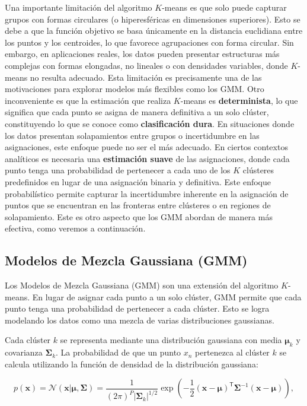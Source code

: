 Una importante limitación del algoritmo \(K\)-means es que solo puede capturar grupos con formas circulares (o hiperesféricas en dimensiones superiores). Esto se debe a que la función objetivo se basa únicamente en la distancia euclidiana entre los puntos y los centroides, lo que favorece agrupaciones con forma circular. Sin embargo, en aplicaciones reales, los datos pueden presentar estructuras más complejas con formas elongadas, no lineales o con densidades variables, donde \(K\)-means no resulta adecuado. Esta limitación es precisamente una de las motivaciones para explorar modelos más flexibles como los GMM. Otro inconveniente es que la estimación que realiza \(K\)-means es \textbf{determinista}, lo que significa que cada punto se asigna de manera definitiva a un solo clúster, constituyendo lo que se conoce como \textbf{clasificación dura}. En situaciones donde los datos presentan solapamientos entre grupos o incertidumbre en las asignaciones, este enfoque puede no ser el más adecuado. En ciertos contextos analíticos es necesaria una \textbf{estimación suave} de las asignaciones, donde cada punto tenga una probabilidad de pertenecer a cada uno de los \(K\) clústeres predefinidos en lugar de una asignación binaria y definitiva. Este enfoque probabilístico permite capturar la incertidumbre inherente en la asignación de puntos que se encuentran en las fronteras entre clústeres o en regiones de solapamiento. Este es otro aspecto que los GMM abordan de manera más efectiva, como veremos a continuación.


\subsection{Modelos de Mezcla Gaussiana (GMM)}

Los Modelos de Mezcla Gaussiana (GMM) son una extensión del algoritmo \(K\)-means. En lugar de asignar cada punto a un solo clúster, GMM permite que cada punto tenga una probabilidad de pertenecer a cada clúster. Esto se logra modelando los datos como una mezcla de varias distribuciones gaussianas.

Cada clúster \(k\) se representa mediante una distribución gaussiana con media \(\boldsymbol{\mu}_k\) y covarianza \(\boldsymbol{\Sigma}_k\). La probabilidad de que un punto \(x_n\) pertenezca al clúster \(k\) se calcula utilizando la función de densidad de la distribución gaussiana:

\[
p(\boldsymbol{x}) = \mathcal{N}(\boldsymbol{x} | \boldsymbol{\mu}, \boldsymbol{\Sigma}
)=\frac{1}{(2\pi)^{P} |\boldsymbol{\Sigma}_k|^{1/2}} \exp\left(-\frac{1}{2} (\boldsymbol{x} - \boldsymbol{\mu})^\mathsf{T} \boldsymbol{\Sigma}^{-1} (\boldsymbol{x} - \boldsymbol{\mu})\right),
\]




